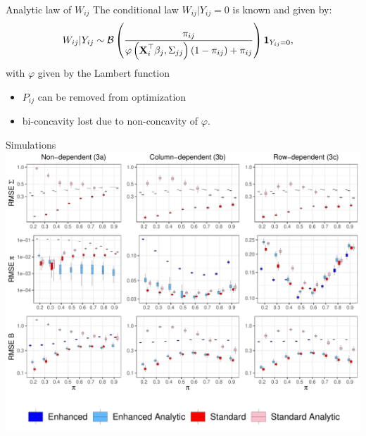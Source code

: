\documentclass{beamer}
\theoremstyle{remark}
\begin{document}
\begin{frame}{Analytic law of $W_{ij}$}
    The conditional law $W_{ij} | Y_{ij} = 0$ is known and given by:
    \begin{align*}\displaystyle
           W_{ij} | Y_{ij}  &\sim \mathcal B\left(\frac{\pi_{ij}}{ \varphi\left(\boldsymbol{\mathbf{X}}_i^{\top} \beta_j, \Sigma_{jj}\right)
       \left(1 - \pi_{ij}\right) + \pi_{ij}}\right) \mathbf 1_{Y_{ij} = 0},\end{align*}
with $\varphi$ given by the Lambert function

\begin{itemize}
    \item $P_{ij}$ can be removed from optimization
    \item bi-concavity lost due to non-concavity of $\varphi$.
\end{itemize}
\end{frame}
\begin{frame}{Simulations}
    \includegraphics[scale=0.30]{figures/proba_stat.pdf}
\end{frame}
\begin{frame}
\end{frame}
\end{document}

